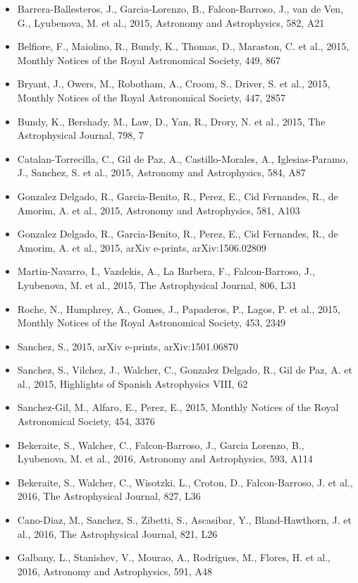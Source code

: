 \documentclass{letter}
\begin{document}
\begin{enumerate}
\begin{itemize}
\item Barrera-Ballesteros, J., Garcia-Lorenzo, B., Falcon-Barroso, J., van de Ven, G., Lyubenova, M. et al., 2015, Astronomy and Astrophysics, 582, A21
\item Belfiore, F., Maiolino, R., Bundy, K., Thomas, D., Maraston, C. et al., 2015, Monthly Notices of the Royal Astronomical Society, 449, 867
\item Bryant, J., Owers, M., Robotham, A., Croom, S., Driver, S. et al., 2015, Monthly Notices of the Royal Astronomical Society, 447, 2857
\item Bundy, K., Bershady, M., Law, D., Yan, R., Drory, N. et al., 2015, The Astrophysical Journal, 798, 7
\item Catalan-Torrecilla, C., Gil de Paz, A., Castillo-Morales, A., Iglesias-Paramo, J., Sanchez, S. et al., 2015, Astronomy and Astrophysics, 584, A87
\item Gonzalez Delgado, R., Garcia-Benito, R., Perez, E., Cid Fernandes, R., de Amorim, A. et al., 2015, Astronomy and Astrophysics, 581, A103
\item Gonzalez Delgado, R., Garcia-Benito, R., Perez, E., Cid Fernandes, R., de Amorim, A. et al., 2015, arXiv e-prints, arXiv:1506.02809
\item Martin-Navarro, I., Vazdekis, A., La Barbera, F., Falcon-Barroso, J., Lyubenova, M. et al., 2015, The Astrophysical Journal, 806, L31
\item Roche, N., Humphrey, A., Gomes, J., Papaderos, P., Lagos, P. et al., 2015, Monthly Notices of the Royal Astronomical Society, 453, 2349
\item Sanchez, S., 2015, arXiv e-prints, arXiv:1501.06870
\item Sanchez, S., Vilchez, J., Walcher, C., Gonzalez Delgado, R., Gil de Paz, A. et al., 2015, Highlights of Spanish Astrophysics VIII, 62
\item Sanchez-Gil, M., Alfaro, E., Perez, E., 2015, Monthly Notices of the Royal Astronomical Society, 454, 3376
\item Bekeraite, S., Walcher, C., Falcon-Barroso, J., Garcia Lorenzo, B., Lyubenova, M. et al., 2016, Astronomy and Astrophysics, 593, A114
\item Bekeraite, S., Walcher, C., Wisotzki, L., Croton, D., Falcon-Barroso, J. et al., 2016, The Astrophysical Journal, 827, L36
\item Cano-Diaz, M., Sanchez, S., Zibetti, S., Ascasibar, Y., Bland-Hawthorn, J. et al., 2016, The Astrophysical Journal, 821, L26
\item Galbany, L., Stanishev, V., Mourao, A., Rodrigues, M., Flores, H. et al., 2016, Astronomy and Astrophysics, 591, A48

\end{itemize}
\end{enumerate}
\end{document}
